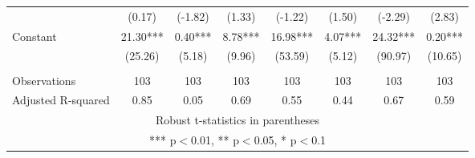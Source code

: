 \documentclass[]{article}
\begin{document}
\begin{tabular}{lccccccc}
 & (0.17) & (-1.82) & (1.33) & (-1.22) & (1.50) & (-2.29) & (2.83) \\
Constant & 21.30*** & 0.40*** & 8.78*** & 16.98*** & 4.07*** & 24.32*** & 0.20*** \\
 & (25.26) & (5.18) & (9.96) & (53.59) & (5.12) & (90.97) & (10.65) \\
 &  &  &  &  &  &  &  \\
Observations & 103 & 103 & 103 & 103 & 103 & 103 & 103 \\
 Adjusted R-squared & 0.85 & 0.05 & 0.69 & 0.55 & 0.44 & 0.67 & 0.59 \\ \hline
\multicolumn{8}{c}{ Robust t-statistics in parentheses} \\
\multicolumn{8}{c}{ *** p$<$0.01, ** p$<$0.05, * p$<$0.1} \\
\end{tabular}
\end{document}
